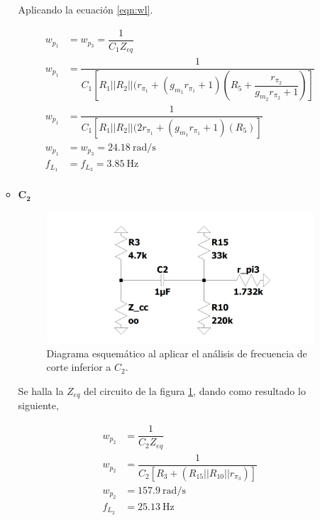 \begin{enumerate}
\begin{itemize}
                Aplicando la ecuación \ref{eqn:wl}.

                \begin{align*}
                  w_{p_1} & =w_{p_3}=\dfrac{1}{C_1Z_{eq}}                                                                                    \\[0.2cm]
                  w_{p_1} & =\dfrac{1}{C_1[R_1||R_2||(r_{\pi_1}+(g_{m_1}r_{\pi_1}+1)\left(R_5+\dfrac{r_{\pi_2}}{g_{m_2}r_{\pi_2}+1}\right)]} \\[0.2cm]
                  w_{p_1} & =\dfrac{1}{C_1[R_1||R_2||(2r_{\pi_1}+(g_{m_1}r_{\pi_1}+1)\left(R_5\right)]}                                      \\[0.2cm]
                  w_{p_1} & =w_{p_3}= \SI{24.18}{\radian\per\second}                                                                         \\[0.2cm]
                  f_{L_1} & =f_{L_3}= \SI{3.85}{\hertz}                                                                                      \\[0.2cm]
                \end{align*}

          \item $\mathbf{C_2}$

                \begin{figure}[H]
                  \centering
                  \includegraphics[width=12cm]{Imagenes/c2.png}
                  \caption{Diagrama esquemático al aplicar el análisis de frecuencia de corte inferior a $C_2$.}
                  \label{fig:c2}
                \end{figure}

                Se halla la $Z_{eq}$ del circuito de la figura \ref{fig:c2}, dando como resultado lo siguiente,

                \begin{align*}
                  w_{p_2} & =\dfrac{1}{C_2Z_{eq}}                            \\[0.2cm]
                  w_{p_2} & =\dfrac{1}{C_2[R_3+(R_{15}||R_{10}||r_{\pi_3})]} \\[0.2cm]
                  w_{p_2} & = \SI{157.9}{\radian\per\second}                 \\[0.2cm]
                  f_{L_2} & = \SI{25.13}{\hertz}                             \\[0.2cm]
                \end{align*}


\end{itemize}
\end{enumerate}
